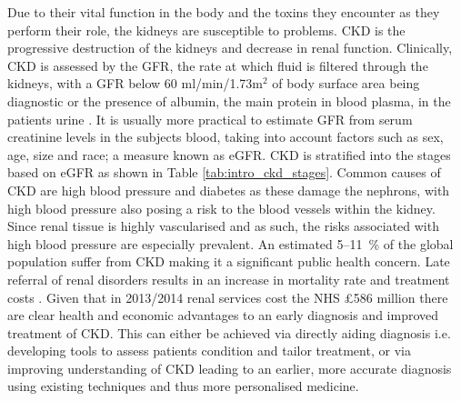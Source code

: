 Due to their vital function in the body and the toxins they encounter as they perform their role, the kidneys are susceptible to problems. \ac{CKD} is the progressive destruction of the kidneys and decrease in renal function. Clinically, \ac{CKD} is assessed by the \ac{GFR}, the rate at which fluid is filtered through the kidneys, with a \ac{GFR} below 60 ml/min/1.73m$^2$ of body surface area being diagnostic or the presence of albumin, the main protein in blood plasma, in the patients urine \cite{stevens_assessing_2006, farrugia_albumin_2010, pruijm_blood_2017}. It is usually more practical to estimate \ac{GFR} from serum creatinine levels in the subjects blood, taking into account factors such as sex, age, size and race; a measure known as \ac{eGFR}. \ac{CKD} is stratified into the stages based on \ac{eGFR} as shown in Table \ref{tab:intro_ckd_stages}. Common causes of \ac{CKD} are high blood pressure and diabetes as these damage the nephrons, with high blood pressure also posing a risk to the blood vessels within the kidney. Since renal tissue is highly vascularised and as such, the risks associated with high blood pressure are especially prevalent. An estimated 5–11~\% of the global population suffer from \ac{CKD} \cite{coresh_prevalence_2003, de_lusignan_identifying_2005, drey_population-based_2003, amato_prevalence_2005, chadban_prevalence_2003} making it a significant public health concern. Late referral of renal disorders results in an increase in mortality rate and treatment costs \cite{jungers_late_1993, sesso_late_1996, klebe_cost_2007}. Given that in 2013/2014 renal services cost the \ac{NHS} \pounds 586 million \cite{precious_nhs_2015} there are clear health and economic advantages to an early diagnosis and improved treatment of \ac{CKD}. This can either be achieved via directly aiding diagnosis i.e. developing tools to assess patients condition and tailor treatment, or via improving understanding of \ac{CKD} leading to an earlier, more accurate diagnosis using existing techniques and thus more personalised medicine.

